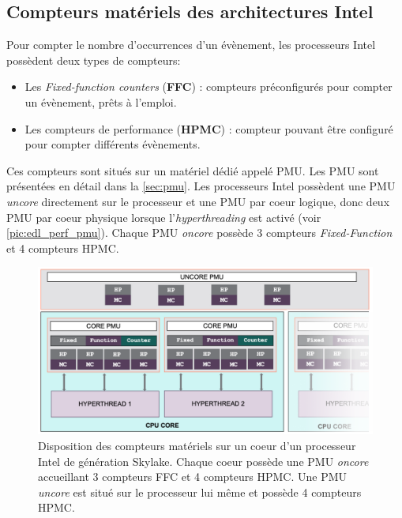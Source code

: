     \subsection{Compteurs matériels des architectures Intel}
        

        Pour compter le nombre d'occurrences d'un évènement, les processeurs Intel possèdent deux types de compteurs:
        \begin{itemize}
            \item Les \textit{Fixed-function counters} (\textbf{FFC}) : compteurs préconfigurés pour compter un évènement, prêts à l'emploi.
            \item Les compteurs de performance (\textbf{HPMC}) : compteur pouvant être configuré pour compter différents évènements.
        \end{itemize}
        Ces compteurs sont situés sur un matériel dédié appelé \gls{PMU}. Les PMU sont présentées en détail dans la \autoref{sec:pmu}. Les processeurs Intel possèdent une PMU \textit{uncore} directement sur le processeur et une PMU par coeur logique, donc deux PMU par coeur physique lorsque l'\textit{hyperthreading} est activé (voir \autoref{pic:edl_perf_pmu}). Chaque PMU \textit{oncore} possède 3 compteurs \textit{Fixed-Function} et 4 compteurs HPMC.
        
        \begin{figure}
        \center
        \includegraphics[width=\linewidth]{images/edl_perf_pmu.png}
        \caption{\label{pic:edl_perf_pmu} Disposition des compteurs matériels sur un coeur d'un processeur Intel de génération Skylake. Chaque coeur possède une PMU \textit{oncore} accueillant 3 compteurs FFC et 4 compteurs HPMC. Une PMU \textit{uncore} est situé sur le processeur lui même et possède 4 compteurs HPMC.}
        \end{figure}
        
